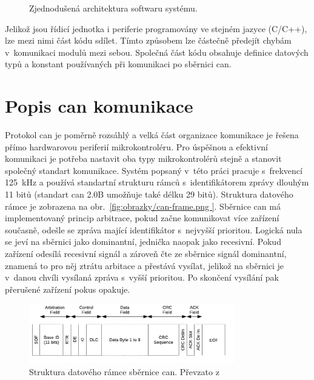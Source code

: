 \begin{figure}[h!]
        
        \caption{Zjednodušená architektura softwaru systému.}
        \label{fig:sw-blokove-schema}
    \end{figure}

    Jelikož jsou řídicí jednotka i periferie programovány ve stejném jazyce (C/C++), lze mezi nimi část kódu sdílet. Tímto způsobem lze částečně předejít chybám v~komunikaci modulů mezi sebou. Společná část kódu obsahuje definice datových typů a konstant používaných při komunikaci po sběrnici \acs{can}.  

\section{Popis \acs{can} komunikace}
    Protokol \acs{can} je poměrně rozsáhlý a velká část organizace komunikace je řešena přímo hardwarovou periferií mikrokontroléru. Pro úspěšnou a efektivní komunikaci je potřeba nastavit oba typy mikrokontrolérů stejně a stanovit společný standart komunikace. Systém popsaný v~této práci pracuje s~frekvencí \qty{125}{kHz} a používá standartní strukturu rámců s~identifikátorem zprávy dlouhým 11 bitů (standart \acs{can} 2.0B umožňuje také délku 29 bitů). Struktura datového rámce je zobrazena na obr.~\ref{fig:obrazky/can-frame.png }. Sběrnice \acs{can} má implementovaný princip arbitrace, pokud začne komunikovat více zařízení současně, odešle se zpráva mající identifikátor s~nejvyšší prioritou. Logická nula se jeví na sběrnici jako dominantní, jednička naopak jako recesivní. Pokud zařízení odesílá recesivní signál a zároveň čte ze sběrnice signál dominantní, znamená to pro něj ztrátu arbitace a přestává vysílat, jelikož na sběrnici je v~danou chvíli vysílaná zpráva s~vyšší prioritou. Po skončení vysílání pak přerušené zařízení pokus opakuje.
    
        \begin{figure}[h!]
            \centering
            \includegraphics[width=0.8\textwidth]{obrazky/can-frame.png}
            \caption{Struktura datového rámce sběrnice \acs{can}. Převzato z~\cite{esp32-datasheet}}
            \label{fig:obrazky/can-frame.png   }
        \end{figure}
        

